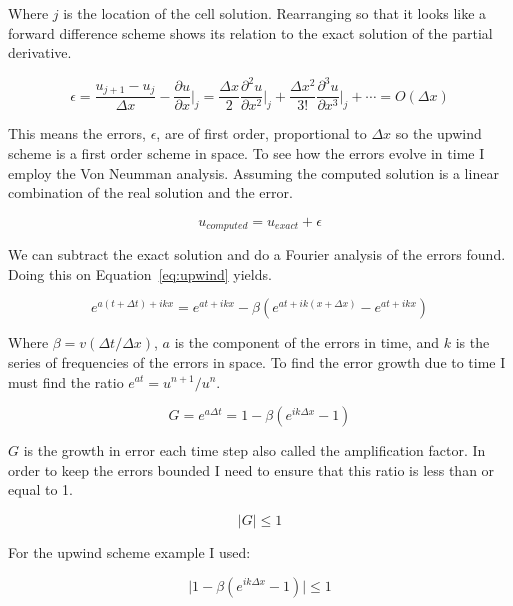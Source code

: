 \documentclass[12pt,upcase]{umlthesis}
\begin{document}
Where $j$ is the location of the cell solution. Rearranging so that it looks like a forward difference scheme shows its relation to the exact solution of the partial derivative.

\begin{equation}
	\epsilon = \frac{u_{j+1} - u_j}{\Delta x} - {\frac{\partial u}{\partial x}}\rvert_j =  \frac{\Delta x}{2} {\frac{\partial^2 u}{\partial x^2}}\rvert_j + \frac{\Delta x^2}{3!} {\frac{\partial^3 u}{\partial x^3}}\rvert_j + \cdots = O(\Delta x)
\end{equation}

This means the errors, $\epsilon$, are of first order, proportional to $\Delta x$ so the upwind scheme is a first order scheme in space. To see how the errors evolve in time I employ the Von Neumman analysis. Assuming the computed solution is a linear combination of the real solution and the error.

\begin{equation}
	u_{computed} = u_{exact} + \epsilon
\end{equation}

We can subtract the exact solution and do a Fourier analysis of the errors found. Doing this on Equation~\ref{eq:upwind} yields.

\begin{equation}
	e^{a(t+\Delta t)+ikx} = e^{at+ikx} - \beta (e^{at + ik(x+\Delta x)}-e^{at + ikx})
\end{equation}

Where $\beta = v(\Delta t / \Delta x)$, $a$ is the component of the errors in time, and $k$ is the series of frequencies of the errors in space. To find the error growth due to time I must find the ratio $e^{at} = u^{n+1}/u^n$.

\begin{equation}
	G = e^{a\Delta t} = 1 - \beta (e^{ik\Delta x}- 1)
\end{equation}

$G$ is the growth in error each time step also called the amplification factor. In order to keep the errors bounded I need to ensure that this ratio is less than or equal to 1.

\begin{equation}
	\lvert G \rvert \leq 1
\end{equation}

For the upwind scheme example I used: 

\begin{equation}
	\lvert 1 - \beta (e^{ik\Delta x}- 1) \rvert \leq 1
\end{equation}
\end{document}
